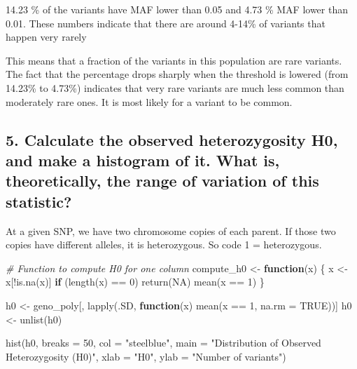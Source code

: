 \documentclass[
]{article}
\newenvironment{Shaded}{\begin{snugshade}}{\end{snugshade}}
\newcommand{\AttributeTok}[1]{\textcolor[rgb]{0.77,0.63,0.00}{#1}}
\newcommand{\CommentTok}[1]{\textcolor[rgb]{0.56,0.35,0.01}{\textit{#1}}}
\newcommand{\ConstantTok}[1]{\textcolor[rgb]{0.00,0.00,0.00}{#1}}
\newcommand{\ControlFlowTok}[1]{\textcolor[rgb]{0.13,0.29,0.53}{\textbf{#1}}}
\newcommand{\DecValTok}[1]{\textcolor[rgb]{0.00,0.00,0.81}{#1}}
\newcommand{\FunctionTok}[1]{\textcolor[rgb]{0.00,0.00,0.00}{#1}}
\newcommand{\NormalTok}[1]{#1}
\newcommand{\OtherTok}[1]{\textcolor[rgb]{0.56,0.35,0.01}{#1}}
\newcommand{\SpecialCharTok}[1]{\textcolor[rgb]{0.00,0.00,0.00}{#1}}
\newcommand{\StringTok}[1]{\textcolor[rgb]{0.31,0.60,0.02}{#1}}
\begin{document}
14.23 \% of the variants have MAF lower than 0.05 and 4.73 \% MAF lower
than 0.01. These numbers indicate that there are around 4-14\% of
variants that happen very rarely

This means that a fraction of the variants in this population are rare
variants. The fact that the percentage drops sharply when the threshold
is lowered (from 14.23\% to 4.73\%) indicates that very rare variants
are much less common than moderately rare ones. It is most likely for a
variant to be common.

\hypertarget{calculate-the-observed-heterozygosity-h0-and-make-a-histogram-of-it.-what-is-theoretically-the-range-of-variation-of-this-statistic}{%
\subsection{5. Calculate the observed heterozygosity H0, and make a
histogram of it. What is, theoretically, the range of variation of this
statistic?}\label{calculate-the-observed-heterozygosity-h0-and-make-a-histogram-of-it.-what-is-theoretically-the-range-of-variation-of-this-statistic}}

At a given SNP, we have two chromosome copies of each parent. If those
two copies have different alleles, it is heterozygous. So code 1 =
heterozygous.

\begin{Shaded}
\begin{Highlighting}[]
\CommentTok{\# Function to compute H0 for one column}
\NormalTok{compute\_h0 }\OtherTok{\textless{}{-}} \ControlFlowTok{function}\NormalTok{(x) \{}
\NormalTok{  x }\OtherTok{\textless{}{-}}\NormalTok{ x[}\SpecialCharTok{!}\FunctionTok{is.na}\NormalTok{(x)]              }
  \ControlFlowTok{if}\NormalTok{ (}\FunctionTok{length}\NormalTok{(x) }\SpecialCharTok{==} \DecValTok{0}\NormalTok{) }\FunctionTok{return}\NormalTok{(}\ConstantTok{NA}\NormalTok{)}
  \FunctionTok{mean}\NormalTok{(x }\SpecialCharTok{==} \DecValTok{1}\NormalTok{)                   }
\NormalTok{\}}

\NormalTok{h0 }\OtherTok{\textless{}{-}}\NormalTok{ geno\_poly[, }\FunctionTok{lapply}\NormalTok{(.SD, }\ControlFlowTok{function}\NormalTok{(x) }\FunctionTok{mean}\NormalTok{(x }\SpecialCharTok{==} \DecValTok{1}\NormalTok{, }\AttributeTok{na.rm =} \ConstantTok{TRUE}\NormalTok{))]}
\NormalTok{h0 }\OtherTok{\textless{}{-}} \FunctionTok{unlist}\NormalTok{(h0)}

\FunctionTok{hist}\NormalTok{(h0,}
     \AttributeTok{breaks =} \DecValTok{50}\NormalTok{,}
     \AttributeTok{col =} \StringTok{"steelblue"}\NormalTok{,}
     \AttributeTok{main =} \StringTok{"Distribution of Observed Heterozygosity (H0)"}\NormalTok{,}
     \AttributeTok{xlab =} \StringTok{"H0"}\NormalTok{,}
     \AttributeTok{ylab =} \StringTok{"Number of variants"}\NormalTok{)}
\end{Highlighting}
\end{Shaded}
\end{document}
